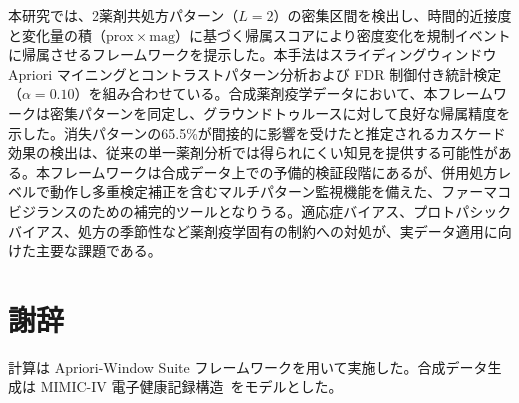 \documentclass[11pt]{article}
\begin{document}
本研究では、2薬剤共処方パターン（$L = 2$）の密集区間を検出し、時間的近接度と変化量の積（$\mathrm{prox} \times \mathrm{mag}$）に基づく帰属スコアにより密度変化を規制イベントに帰属させるフレームワークを提示した。本手法はスライディングウィンドウ Apriori マイニングとコントラストパターン分析および FDR 制御付き統計検定（$\alpha = 0.10$）を組み合わせている。合成薬剤疫学データにおいて、本フレームワークは密集パターンを同定し、グラウンドトゥルースに対して良好な帰属精度を示した。消失パターンの65.5\%が間接的に影響を受けたと推定されるカスケード効果の検出は、従来の単一薬剤分析では得られにくい知見を提供する可能性がある。本フレームワークは合成データ上での予備的検証段階にあるが、併用処方レベルで動作し多重検定補正を含むマルチパターン監視機能を備えた、ファーマコビジランスのための補完的ツールとなりうる。適応症バイアス、プロトパシックバイアス、処方の季節性など薬剤疫学固有の制約への対処が、実データ適用に向けた主要な課題である。

\section*{謝辞}
\small
計算は Apriori-Window Suite フレームワークを用いて実施した。合成データ生成は MIMIC-IV 電子健康記録構造~\citep{johnson2023mimiciv}をモデルとした。



\end{document}

